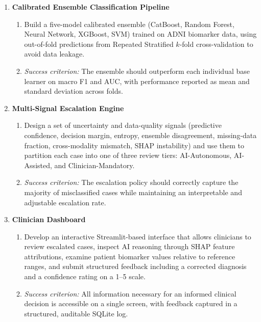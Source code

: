 \documentclass[12pt, a4paper]{report}
\begin{document}
  \begin{enumerate}[leftmargin=*, label=\textbf{O\arabic*.}]

    \item \textbf{Calibrated Ensemble Classification Pipeline}
    \begin{enumerate}[label=(\alph*)]
      \item Build a five-model calibrated ensemble (CatBoost, Random Forest, Neural
      Network, XGBoost, SVM) trained on ADNI biomarker data, using out-of-fold
      predictions from Repeated Stratified $k$-fold cross-validation to avoid data
      leakage.
      \item \textit{Success criterion:} The ensemble should outperform each individual
      base learner on macro F1 and AUC, with performance reported as mean and standard
      deviation across folds.
    \end{enumerate}

    \item \textbf{Multi-Signal Escalation Engine}
    \begin{enumerate}[label=(\alph*)]
      \item Design a set of uncertainty and data-quality signals (predictive
      confidence, decision margin, entropy, ensemble disagreement, missing-data
      fraction, cross-modality mismatch, SHAP instability) and use them to partition
      each case into one of three review tiers: AI-Autonomous, AI-Assisted, and
      Clinician-Mandatory.
      \item \textit{Success criterion:} The escalation policy should correctly capture
      the majority of misclassified cases while maintaining an interpretable and
      adjustable escalation rate.
    \end{enumerate}

    \item \textbf{Clinician Dashboard}
    \begin{enumerate}[label=(\alph*)]
      \item Develop an interactive Streamlit-based interface that allows clinicians to
      review escalated cases, inspect AI reasoning through SHAP feature attributions,
      examine patient biomarker values relative to reference ranges, and submit
      structured feedback including a corrected diagnosis and a confidence rating on a
      1--5 scale.
      \item \textit{Success criterion:} All information necessary for an informed
      clinical decision is accessible on a single screen, with feedback captured in a
      structured, auditable SQLite log.
    \end{enumerate}


\end{enumerate}
\end{document}

